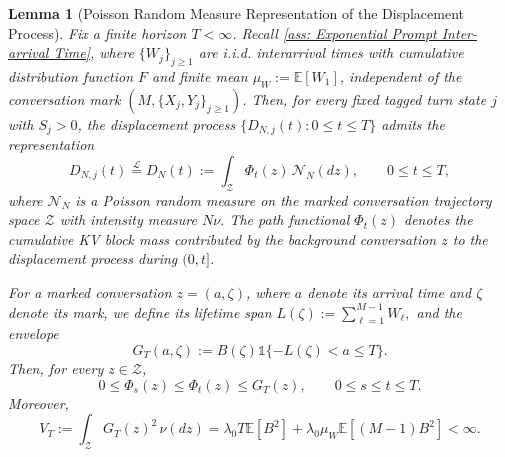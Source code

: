\documentclass[10pt,a4paper]{amsart}
\newtheorem{lemma}{Lemma}
\newcommand{\E}{\mathbb E}
\newcommand{\one}{\mathds{1}}
\begin{document}
\begin{lemma}[Poisson Random Measure Representation of the Displacement Process]
\label{lem: Poisson Random Measure Representation}
    Fix a finite horizon $T<\infty$. Recall \cref{ass: Exponential Prompt Inter-arrival Time}, where $\{W_j\}_{j\geq1}$ are i.i.d. interarrival times with cumulative distribution function $F$ and finite mean $\mu_W:=\E[W_1]$, independent of the conversation mark $(M,\{X_j,Y_j\}_{j\geq1})$. Then, for every fixed tagged turn state $j$ with $S_j>0$, the displacement process $\{D_{N,j}(t):0\leq t\leq T\}$ admits the representation
    \begin{equation}
    \label{equ: Poisson Random Measure Representation}
        D_{N,j}(t)\stackrel{\mathcal L}{=}D_N(t):=\int_{\mathcal Z}\Phi_t(z)\,\mathcal N_N(dz), \qquad 0\leq t\leq T,
    \end{equation}
    where $\mathcal N_N$ is a Poisson random measure on the marked conversation trajectory space $\mathcal Z$ with intensity measure $N\nu$. The path functional $\Phi_t(z)$ denotes the cumulative KV block mass contributed by the background conversation $z$ to the displacement process during $(0,t]$.

    For a marked conversation $z=(a,\zeta)$, where $a$ denote its arrival time and $\zeta$ denote its mark, we define its lifetime span $L(\zeta):=\sum_{\ell=1}^{M-1}W_\ell,$ and the envelope
    \begin{equation*}
        G_T(a,\zeta):=B(\zeta)\one\{-L(\zeta)<a\leq T\}.
    \end{equation*}
    Then, for every $z\in\mathcal Z$,
    \begin{equation}
    \label{equ: PRM contribution bound}
        0\leq\Phi_s(z)\leq\Phi_t(z)\leq G_T(z), \qquad 0\leq s\leq t\leq T.
    \end{equation}
    Moreover,
    \begin{equation}
    \label{equ: PRM second moment constant}
        V_T:=\int_{\mathcal Z}G_T(z)^2\,\nu(dz)=\lambda_0T\E[B^2]+\lambda_0\mu_W\E[(M-1)B^2]<\infty.
    \end{equation}
\end{lemma}
\end{document}
